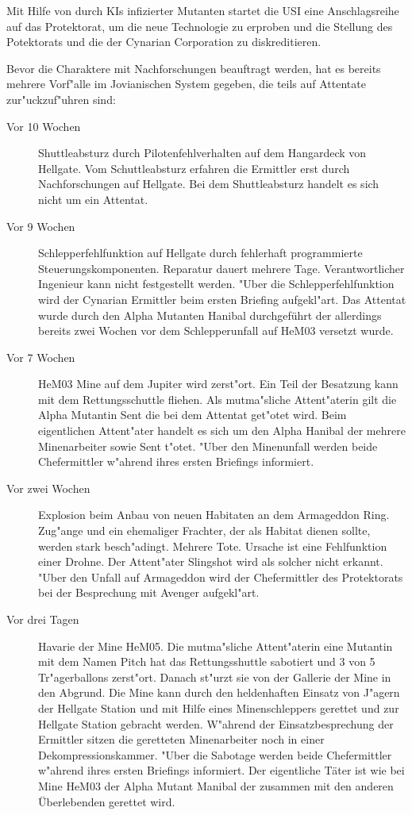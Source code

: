 
Mit Hilfe von durch KIs infizierter Mutanten startet die USI eine Anschlagsreihe auf das Protektorat, um die neue Technologie zu erproben und die Stellung des Potektorats und die der Cynarian Corporation zu diskreditieren.

Bevor die Charaktere mit Nachforschungen beauftragt werden, hat es bereits mehrere Vorf"alle im Jovianischen System gegeben, die teils auf Attentate zur"uckzuf"uhren sind:

\begin{description}
\item [Vor 10 Wochen] Shuttleabsturz durch Pilotenfehlverhalten auf dem Hangardeck von Hellgate. Vom Schuttleabsturz erfahren die 
      Ermittler erst durch Nachforschungen auf Hellgate. Bei dem Shuttleabsturz handelt es sich nicht um ein Attentat.
\item [Vor 9 Wochen] Schlepperfehlfunktion auf Hellgate durch fehlerhaft programmierte Steuerungskomponenten. Reparatur dauert
      mehrere Tage. Verantwortlicher Ingenieur kann nicht festgestellt werden. "Uber die Schlepperfehlfunktion wird der Cynarian Ermittler beim ersten Briefing aufgekl"art. Das Attentat wurde durch den Alpha Mutanten Hanibal durchgeführt der allerdings bereits zwei Wochen vor dem Schlepperunfall auf HeM03 versetzt wurde.      
\item [Vor 7 Wochen] HeM03 Mine auf dem Jupiter wird zerst"ort. Ein Teil der Besatzung kann mit dem  Rettungsschuttle fliehen. Als 
      mutma"sliche Attent"aterin gilt die Alpha Mutantin Sent die bei dem Attentat get"otet wird. Beim eigentlichen Attent"ater handelt es sich um den Alpha Hanibal der mehrere Minenarbeiter sowie Sent t"otet. "Uber den Minenunfall werden beide Chefermittler w"ahrend ihres ersten Briefings informiert.
\item [Vor zwei Wochen] Explosion beim Anbau von neuen Habitaten an dem Armageddon Ring. Zug"ange und ein
      ehemaliger Frachter, der als Habitat dienen sollte, werden stark besch"adingt.  Mehrere Tote. Ursache ist eine Fehlfunktion einer Drohne. Der Attent"ater Slingshot wird als solcher nicht erkannt. "Uber den Unfall auf Armageddon wird der Chefermittler des Protektorats bei der Besprechung mit Avenger aufgekl"art.
\item [Vor drei Tagen] Havarie der Mine HeM05. Die mutma"sliche Attent"aterin eine Mutantin mit dem Namen Pitch hat das
      Rettungsshuttle sabotiert und 3 von 5 Tr"agerballons zerst"ort. Danach st"urzt sie von der Gallerie der Mine in den Abgrund. Die Mine kann durch den heldenhaften Einsatz von J"agern der Hellgate Station und mit Hilfe eines Minenschleppers gerettet und zur Hellgate Station gebracht werden. W"ahrend der Einsatzbesprechung der Ermittler sitzen die geretteten Minenarbeiter noch in einer Dekompressionskammer. "Uber die Sabotage werden beide Chefermittler w"ahrend ihres ersten Briefings informiert. Der eigentliche
      Täter ist wie bei Mine HeM03 der Alpha Mutant Manibal der zusammen mit den anderen Überlebenden gerettet wird.
\end{description}


